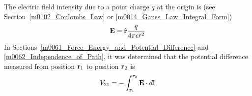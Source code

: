 

\label{m0064_V_due_to_Point_Charges} %

The electric field intensity due to a point charge $q$ at the origin is
(see Section~\ref{m0102_Coulombs_Law} or \ref{m0014_Gauss_Law_Integral_Form}) 
%
\begin{equation}   
{\bf E}  = \hat{\bf r}\frac{q}{4\pi\epsilon r^2}
\label{eEPPCE}
\end{equation}
%
In Sections~\ref{m0061_Force_Energy_and_Potential_Difference} and \ref{m0062_Independence_of_Path}, it was determined that the potential difference measured from position ${\bf r}_1$ to position ${\bf r}_2$ is
%
\begin{equation}
V_{21} = - \int_{{\bf r}_1}^{{\bf r}_2} {\bf E} \cdot d{\bf l}
\label{m0064_eV12}
\end{equation}

